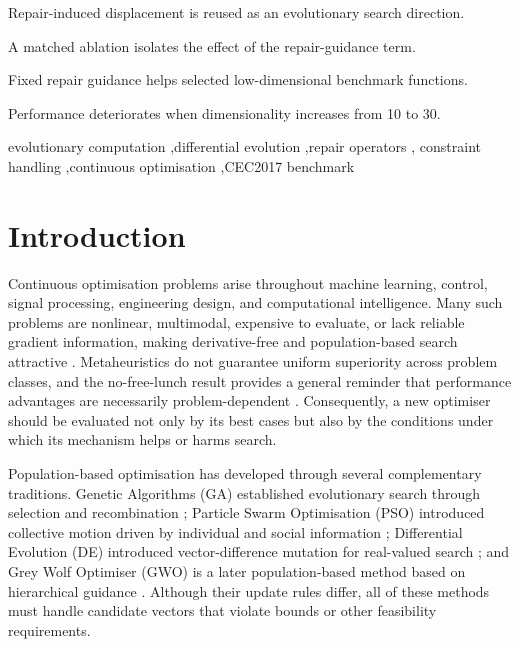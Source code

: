 \documentclass[a4paper,fleqn]{cas-sc}
\begin{document}
\begin{highlights}
\item Repair-induced displacement is reused as an evolutionary search direction.
\item A matched ablation isolates the effect of the repair-guidance term.
\item Fixed repair guidance helps selected low-dimensional benchmark functions.
\item Performance deteriorates when dimensionality increases from 10 to 30.
\end{highlights}

\begin{keywords}
evolutionary computation \sep differential evolution \sep repair operators \sep
constraint handling \sep continuous optimisation \sep CEC2017 benchmark
\end{keywords}

\maketitle

\section{Introduction}

Continuous optimisation problems arise throughout machine learning, control, signal processing, engineering design, and computational intelligence. Many such problems are nonlinear, multimodal, expensive to evaluate, or lack reliable gradient information, making derivative-free and population-based search attractive \cite{yang2010engineering,talbi2009metaheuristics,nocedal2006numerical}. Metaheuristics do not guarantee uniform superiority across problem classes, and the no-free-lunch result provides a general reminder that performance advantages are necessarily problem-dependent \cite{wolpert1997nfl}. Consequently, a new optimiser should be evaluated not only by its best cases but also by the conditions under which its mechanism helps or harms search.

Population-based optimisation has developed through several complementary traditions. Genetic Algorithms (GA) established evolutionary search through selection and recombination \cite{holland1992adaptation}; Particle Swarm Optimisation (PSO) introduced collective motion driven by individual and social information \cite{kennedy1995particle}; Differential Evolution (DE) introduced vector-difference mutation for real-valued search \cite{storn1997differential}; and Grey Wolf Optimiser (GWO) is a later population-based method based on hierarchical guidance \cite{mirjalili2014grey}. Although their update rules differ, all of these methods must handle candidate vectors that violate bounds or other feasibility requirements.
\end{document}
